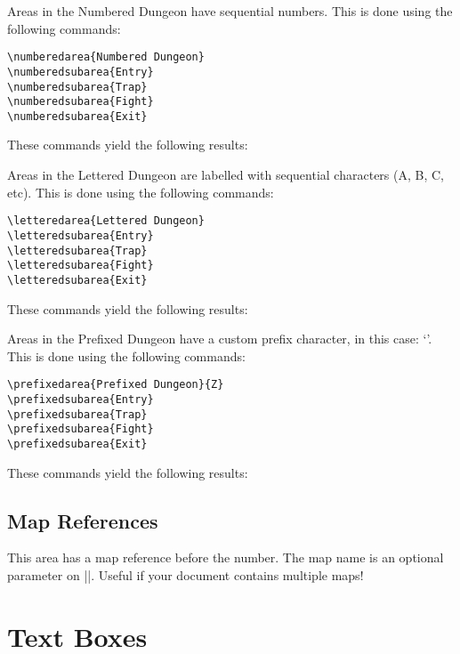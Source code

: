 \documentclass[letterpaper,twocolumn,openany,fancy,nodeprecatedcode]{dndbook}
\begin{document}
Areas in the Numbered Dungeon have sequential numbers. This is done using
the following commands:

\begin{verbatim}
\numberedarea{Numbered Dungeon}
\numberedsubarea{Entry}
\numberedsubarea{Trap}
\numberedsubarea{Fight}
\numberedsubarea{Exit}
\end{verbatim}

These commands yield the following results:

Areas in the Lettered Dungeon are labelled with sequential characters
(A, B, C, etc). This is done using the following commands:

\begin{verbatim}
\letteredarea{Lettered Dungeon}
\letteredsubarea{Entry}
\letteredsubarea{Trap}
\letteredsubarea{Fight}
\letteredsubarea{Exit}
\end{verbatim}

These commands yield the following results:

Areas in the Prefixed Dungeon have a custom prefix character,
in this case: `\prefixedareaprefix'.
This is done using the following commands:

\begin{verbatim}
\prefixedarea{Prefixed Dungeon}{Z}
\prefixedsubarea{Entry}
\prefixedsubarea{Trap}
\prefixedsubarea{Fight}
\prefixedsubarea{Exit}
\end{verbatim}

These commands yield the following results:

\section{Map References}

This area has a map reference before the number. The map name is an optional parameter on |\DndArea|. Useful if your document contains multiple maps!

\chapter{Text Boxes}
\end{document}

